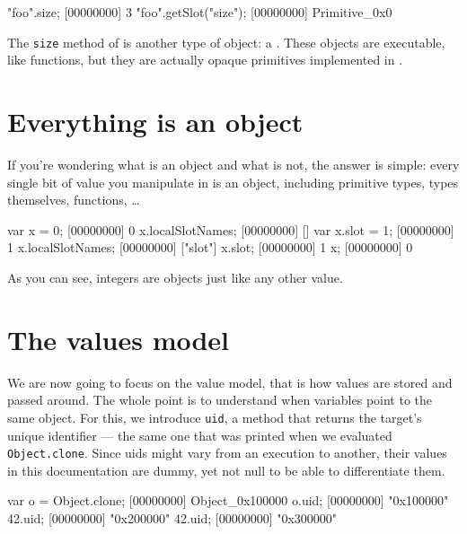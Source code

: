 \begin{urbiscript}[firstnumber=last]
"foo".size;
[00000000] 3
"foo".getSlot("size");
[00000000] Primitive_0x0
\end{urbiscript}

The \lstinline{size} method of  is another type of
object: a . These objects are executable, like
functions, but they are actually opaque primitives implemented in
\Cxx.

\section{Everything is an object}

If you're wondering what is an object and what is not, the answer is
simple: every single bit of value you manipulate in \us is an
object, including primitive types, types themselves, functions, \ldots

\begin{urbiscript}[firstnumber=last]
var x = 0;
[00000000] 0
x.localSlotNames;
[00000000] []
var x.slot = 1;
[00000000] 1
x.localSlotNames;
[00000000] ["slot"]
x.slot;
[00000000] 1
x;
[00000000] 0
\end{urbiscript}

As you can see, integers are objects just like any other value.

\section{The \us values model}

We are now going to focus on the \us value model, that is how values
are stored and passed around. The whole point is to understand when
variables point to the same object.  For this, we introduce
\lstinline{uid}, a method that returns the target's unique identifier
--- the same one that was printed when we evaluated
\lstinline|Object.clone|.  Since uids might vary from an execution to
another, their values in this documentation are dummy, yet not null to
be able to differentiate them.

\begin{urbiscript}
var o = Object.clone;
[00000000] Object_0x100000
o.uid;
[00000000] "0x100000"
42.uid;
[00000000] "0x200000"
42.uid;
[00000000] "0x300000"
\end{urbiscript}

